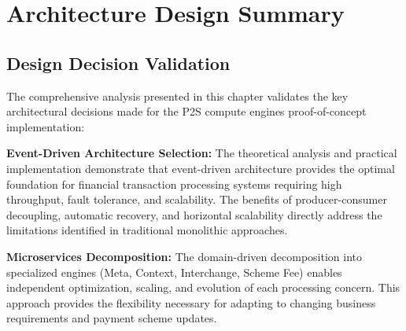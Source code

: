 

\section{Architecture Design Summary}

\subsection{Design Decision Validation}

The comprehensive analysis presented in this chapter validates the key architectural decisions made for the P2S compute engines proof-of-concept implementation:

\textbf{Event-Driven Architecture Selection:}
The theoretical analysis and practical implementation demonstrate that event-driven architecture provides the optimal foundation for financial transaction processing systems requiring high throughput, fault tolerance, and scalability. The benefits of producer-consumer decoupling, automatic recovery, and horizontal scalability directly address the limitations identified in traditional monolithic approaches.

\textbf{Microservices Decomposition:}
The domain-driven decomposition into specialized engines (Meta, Context, Interchange, Scheme Fee) enables independent optimization, scaling, and evolution of each processing concern. This approach provides the flexibility necessary for adapting to changing business requirements and payment scheme updates.

